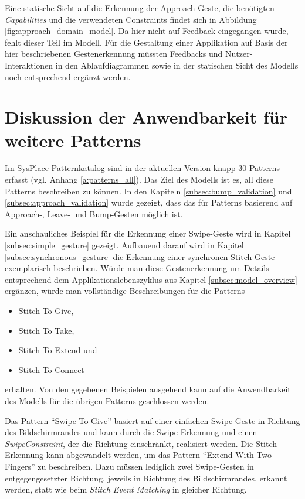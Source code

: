 Eine statische Sicht auf die Erkennung der Approach-Geste, die benötigten \textit{Capabilities} und die verwendeten Constraints findet sich in Abbildung \ref{fig:approach_domain_model}. Da hier nicht auf Feedback eingegangen wurde, fehlt dieser Teil im Modell. Für die Gestaltung einer Applikation auf Basis der hier beschriebenen Gestenerkennung müssten Feedbacks und Nutzer-Interaktionen in den Ablaufdiagrammen sowie in der statischen Sicht des Modells noch entsprechend ergänzt werden.

\section{Diskussion der Anwendbarkeit für weitere Patterns}
Im SysPlace-Patternkatalog sind in der aktuellen Version knapp 30 Patterns erfasst (vgl. Anhang \ref{a:patterns_all}). Das Ziel des Modells ist es, all diese Patterns beschreiben zu können. In den Kapiteln \ref{subsec:bump_validation} und \ref{subsec:approach_validation} wurde gezeigt, dass das für Patterns basierend auf Approach-, Leave- und Bump-Gesten möglich ist.

Ein anschauliches Beispiel für die Erkennung einer Swipe-Geste wird in Kapitel \ref{subsec:simple_gesture} gezeigt. Aufbauend darauf wird in Kapitel \ref{subsec:synchronous_gesture} die Erkennung einer synchronen Stitch-Geste exemplarisch beschrieben. Würde man diese Gestenerkennung um Details entsprechend dem Applikationslebenszyklus aus Kapitel \ref{subsec:model_overview} ergänzen, würde man vollständige Beschreibungen für die Patterns
\begin{itemize}
\item Stitch To Give,
\item Stitch To Take,
\item Stitch To Extend und
\item Stitch To Connect
\end{itemize}
erhalten. Von den gegebenen Beispielen ausgehend kann auf die Anwendbarkeit des Modells für die übrigen Patterns geschlossen werden. 

Das Pattern "`Swipe To Give"' basiert auf einer einfachen Swipe-Geste in Richtung des Bildschirmrandes und kann durch die Swipe-Erkennung und einen \textit{Swipe\-Con\-straint}, der die Richtung einschränkt, realisiert werden. Die Stitch-Erkennung kann abgewandelt werden, um das Pattern "`Extend With Two Fingers"' zu beschreiben. Dazu müssen lediglich zwei Swipe-Gesten in entgegengesetzter Richtung, jeweils in Richtung des Bildschirmrandes, erkannt werden, statt wie beim \textit{Stitch Event Matching} in gleicher Richtung.

